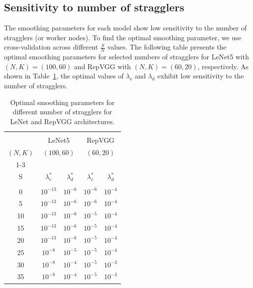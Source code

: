 \documentclass{article}
\begin{document}
\subsection{Sensitivity to number of stragglers}
The smoothing parameters for each model show low sensitivity to the number of stragglers (or worker nodes). To find the optimal smoothing parameter, we use cross-validation across different $\frac{S}{N}$ values. The following table presents the optimal smoothing parameters for selected numbers of stragglers for LeNet5 with $(N, K) = (100, 60)$ and RepVGG with $(N, K) = (60, 20)$, respectively. As shown in Table~\ref{tab:sensitivity_straggler}, the optimal values of $\lambda_\textrm{e}$ and $\lambda_\textrm{d}$ exhibit low sensitivity to the number of stragglers.
\setlength{\tabcolsep}{4pt}
\begin{table}[!htb]
\caption{Optimal smoothing parameters for different number of stragglers for LeNet and RepVGG architectures.}
\label{tab:sensitivity_straggler}
\begin{center}
\begin{small}
\begin{sc}
\begin{tabular}{ccc|cc}
    \hline  & \\[-2.7ex]
    ~ %
    & \multicolumn{2}{c}{LeNet5} & \multicolumn{2}{c}{RepVGG}  \\
    $(N, K)$
    &  \multicolumn{2}{c}{$(100, 60)$}  & \multicolumn{2}{c}{$(60, 20)$} \\
    \cline{1-3}
    \cline{4-5}
     & \\[-2.7ex]
     S & \multicolumn{1}{c}{$\lambda^*_{e}$} & \multicolumn{1}{c}{$\lambda^*_{d}$} & \multicolumn{1}{c}{$\lambda^*_{e}$} & \multicolumn{1}{c}{$\lambda^*_{d}$} \\
    \hline  & \\[-1.5ex]
    0 & $10^{-13}$ & $10^{-6}$ & $10^{-6}$ & $10^{-4}$ \\
    5 & $10^{-13}$ & $10^{-6}$ & $10^{-6}$ & $10^{-4}$ \\
    10 & $10^{-13}$ & $10^{-6}$  & $10^{-5}$ & $10^{-4}$\\
    15 & $10^{-13}$ & $10^{-6}$  & $10^{-5}$ & $10^{-4}$\\
    20 & $10^{-13}$ & $10^{-6}$ & $10^{-5}$ & $10^{-4}$ \\
    25 & $10^{-8}$ & $10^{-5}$ & $10^{-5}$ & $10^{-4}$\\
    30 & $10^{-8}$ & $10^{-4}$ & $10^{-5}$ & $10^{-3}$ \\
    35 & $10^{-8}$ & $10^{-4}$ & $10^{-5}$ & $10^{-3}$\\
    \bottomrule
\end{tabular}
\end{sc}
\end{small}
\end{center}
\end{table}
\end{document}
